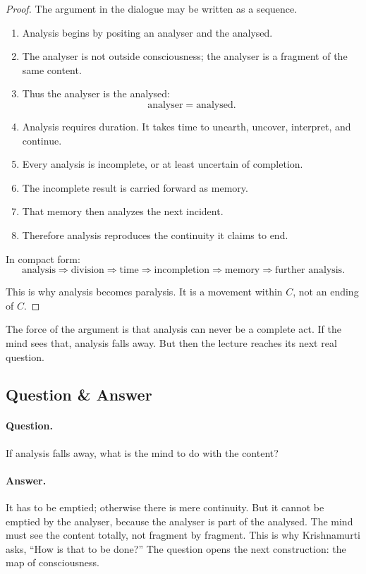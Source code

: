 \begin{proof}
The argument in the dialogue may be written as a sequence.

\begin{enumerate}
\item Analysis begins by positing an analyser and the analysed.
\item The analyser is not outside consciousness; the analyser is a fragment of the same content.
\item Thus the analyser is the analysed:
\begin{equation}
\text{analyser} = \text{analysed}.
\end{equation}
\item Analysis requires duration. It takes time to unearth, uncover, interpret, and continue.
\item Every analysis is incomplete, or at least uncertain of completion.
\item The incomplete result is carried forward as memory.
\item That memory then analyzes the next incident.
\item Therefore analysis reproduces the continuity it claims to end.
\end{enumerate}

In compact form:
\begin{equation}
\text{analysis}
\Rightarrow
\text{division}
\Rightarrow
\text{time}
\Rightarrow
\text{incompletion}
\Rightarrow
\text{memory}
\Rightarrow
\text{further analysis}.
\end{equation}

This is why analysis becomes paralysis. It is a movement within \(C\), not an ending of \(C\).
\end{proof}

The force of the argument is that analysis can never be a complete act. If the mind sees that, analysis falls away. But then the lecture reaches its next real question.

\subsection{Question \& Answer}

\paragraph{Question.}
If analysis falls away, what is the mind to do with the content?

\paragraph{Answer.}
It has to be emptied; otherwise there is mere continuity. But it cannot be emptied by the analyser, because the analyser is part of the analysed. The mind must see the content totally, not fragment by fragment. This is why Krishnamurti asks, ``How is that to be done?'' The question opens the next construction: the map of consciousness.

